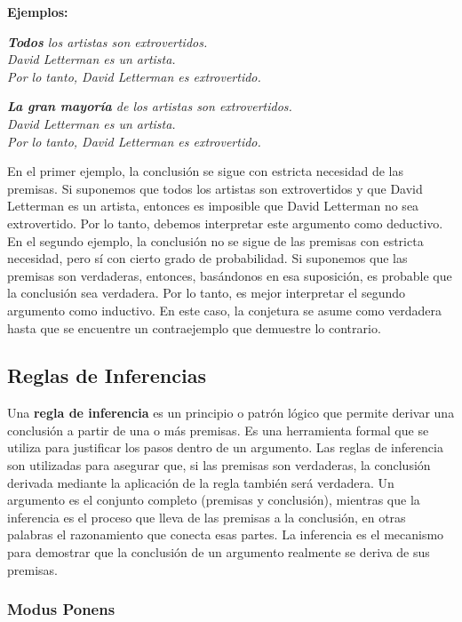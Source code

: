 \textbf{Ejemplos:}

\textit{\textbf{Todos} los artistas son extrovertidos.} \\
\textit{David Letterman es un artista.} \\
\textit{Por lo tanto, David Letterman es extrovertido.}

\textit{\textbf{La gran mayoría} de los artistas son extrovertidos.} \\ 
\textit{David Letterman es un artista.} \\
\textit{Por lo tanto, David Letterman es extrovertido.}

En el primer ejemplo, la conclusión se sigue con estricta necesidad de las premisas. Si suponemos que todos los artistas son extrovertidos y que David Letterman es un artista, entonces es imposible que David Letterman no sea extrovertido. Por lo tanto, debemos interpretar este argumento como deductivo. En el segundo ejemplo, la conclusión no se sigue de las premisas con estricta necesidad, pero sí con cierto grado de probabilidad. Si suponemos que las premisas son verdaderas, entonces, basándonos en esa suposición, es probable que la conclusión sea verdadera. Por lo tanto, es mejor interpretar el segundo argumento como inductivo. En este caso, la conjetura se asume como verdadera hasta que se encuentre un contraejemplo que demuestre lo contrario.

\subsection{Reglas de Inferencias}

Una \textbf{regla de inferencia} es un principio o patrón lógico que permite derivar una conclusión a partir de una o más premisas. Es una herramienta formal que se utiliza para justificar los pasos dentro de un argumento. Las reglas de inferencia son utilizadas para asegurar que, si las premisas son verdaderas, la conclusión derivada mediante la aplicación de la regla también será verdadera. Un argumento es el conjunto completo (premisas y conclusión), mientras que la inferencia es el proceso que lleva de las premisas a la conclusión, en otras palabras el razonamiento que conecta esas partes. La inferencia es el mecanismo para demostrar que la conclusión de un argumento realmente se deriva de sus premisas.

\subsubsection{Modus Ponens}

